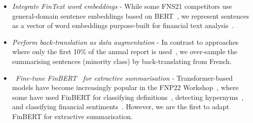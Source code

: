 \begin{itemize}
    \item \emph{Integrate FinText word embeddings} - While some FNS21 competitors use general-domain sentence embeddings
    based on BERT~\cite{litvak-vanetik-2021-summarization, gokhan-etal-2021-extractive}, we represent sentences as
    a vector of word embeddings purpose-built for financial text analysis~\cite{rahimikia2021realised}.
    \item \emph{Perform back-translation as data augmentation} - In contrast to approaches where only the first 10\% of
    the annual report is used~\cite{orzhenovskii-2021-t5}, we over-sample the summarising sentences (minority class)
    by back-translating from French.
    \item~\emph{Fine-tune FinBERT~\cite{yang2020finbert} for extractive summarisation} - Transformer-based models have become increasingly
    popular in the FNP22 Workshop~\cite{khanna-etal-2022-transformer, pant-chopra-2022-multilingual},
    where some have used FinBERT for classifying definitions~\cite{ghosh-etal-2022-finrad},
    detecting hypernyms~\cite{peng-etal-2022-discovering}, and classifying financial sentiments~\cite{stepisnik-perdih-etal-2022-sentiment}.
    However, we are the first to adapt FinBERT for extractive summarisation.
\end{itemize}

